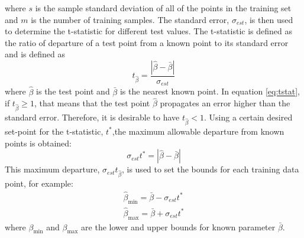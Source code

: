 \documentclass[letterpaper, 10 pt, conference]{ieeeconf}  %
\begin{document}
where $s$ is the sample standard deviation of all of the points in the training set and $m$ is the number of training samples. The standard error, $\sigma_{est}$, is then used to determine the t-statistic for different test values. The t-statistic is defined as the ratio of departure of a test point from a known point to its standard error and is defined as
\begin{equation} \label{eq:tstat}
t_{\hat{\beta}} = \frac{|\hat{\beta}-\bar{\beta}|}{\sigma_{est}}    
\end{equation}
where $\hat{\beta}$ is the test point and $\bar{\beta}$ is the nearest known point. In equation \eqref{eq:tstat}, if $t_{\hat{\beta}} \geq 1$, that means that the test point $\hat{\beta}$ propagates an error higher than the standard error. Therefore, it is desirable to have $t_{\hat{\beta}} < 1$. Using a certain desired set-point for the t-statistic, $t^*$,the maximum allowable departure from known points is obtained:
\begin{equation}
    \sigma_{est}t^* = |\hat{\beta}-\bar{\beta}|
\end{equation}
This maximum departure, $\sigma_{est}t_{\hat{\beta}}$, is used to set the bounds for each training data point, for example:
\begin{align}
    \hat{\beta}_{\min} = \bar{\beta} - \sigma_{est}t^* \nonumber \\
    \hat{\beta}_{\max} = \bar{\beta} + \sigma_{est}t^*
\end{align}
where $\beta_{\min}$ and $\beta_{\max}$ are the lower and upper bounds for known parameter $\bar{\beta}$.
\end{document}
